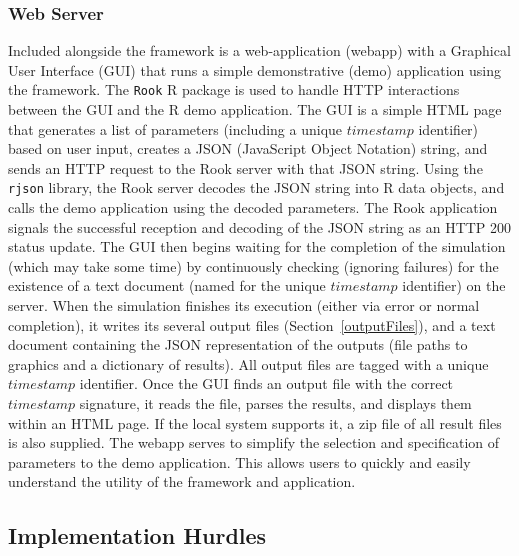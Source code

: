 \subsubsection{Web Server}
\label{webServer}
Included alongside the framework is a web-application (webapp) with a Graphical User Interface (GUI) that runs a simple demonstrative (demo) application using the framework.  The \texttt{Rook} R package is used to handle HTTP interactions between the GUI and the R demo application.  The GUI is a simple HTML page that generates a list of parameters (including a unique $timestamp$ identifier) based on user input, creates a JSON (JavaScript Object Notation) string, and sends an HTTP request to the Rook server with that JSON string.  Using the \texttt{rjson} library, the Rook server decodes the JSON string into R data objects, and calls the demo application using the decoded parameters.  The Rook application signals the successful reception and decoding of the JSON string as an HTTP 200 status update.  The GUI then begins waiting for the completion of the simulation (which may take some time) by continuously checking (ignoring failures) for the existence of a text document (named for the unique $timestamp$ identifier) on the server.  When the simulation finishes its execution (either via error or normal completion), it writes its several output files (Section~\ref{outputFiles}), and a text document containing the JSON representation of the outputs (file paths to graphics and a dictionary of results).  All output files are tagged with a unique $timestamp$ identifier.  Once the GUI finds an output file with the correct $timestamp$ signature, it reads the file, parses the results, and displays them within an HTML page.  If the local system supports it, a zip file of all result files is also supplied.  The webapp serves to simplify the selection and specification of parameters to the demo application.  This allows users to quickly and easily understand the utility of the framework and application.


\subsection{Implementation Hurdles}
